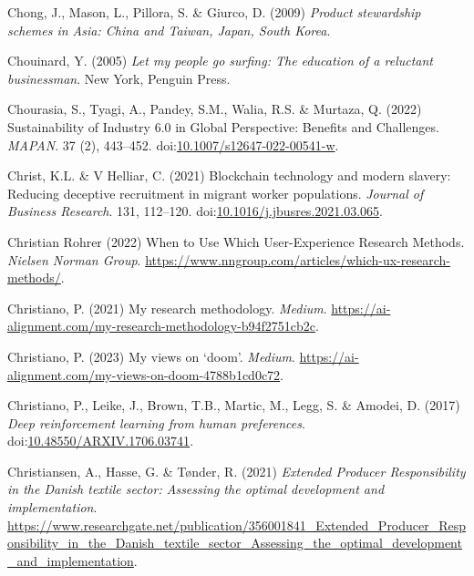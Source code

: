 \documentclass[
  letterpaper,
  DIV=11,
  numbers=noendperiod]{scrartcl}
\newlength{\cslhangindent}
\newenvironment{CSLReferences}[2] %
 {\begin{list}{}{%
  \setlength{\itemindent}{0pt}
  \setlength{\leftmargin}{0pt}
  \setlength{\parsep}{0pt}
  \ifodd #1
   \setlength{\leftmargin}{\cslhangindent}
   \setlength{\itemindent}{-1\cslhangindent}
  \fi
  \setlength{\itemsep}{#2\baselineskip}}}
 {\end{list}}
\begin{document}
\begin{CSLReferences}{0}{1}
Chong, J., Mason, L., Pillora, S. \& Giurco, D. (2009) \emph{Product
stewardship schemes in {Asia}: {China} and {Taiwan}, {Japan}, {South
Korea}}.

Chouinard, Y. (2005) \emph{Let my people go surfing: The education of a
reluctant businessman}. New York, Penguin Press.

Chourasia, S., Tyagi, A., Pandey, S.M., Walia, R.S. \& Murtaza, Q.
(2022) Sustainability of {Industry} 6.0 in {Global Perspective}:
{Benefits} and {Challenges}. \emph{MAPAN}. 37 (2), 443--452.
doi:\href{https://doi.org/10.1007/s12647-022-00541-w}{10.1007/s12647-022-00541-w}.

Christ, K.L. \& V Helliar, C. (2021) Blockchain technology and modern
slavery: {Reducing} deceptive recruitment in migrant worker populations.
\emph{Journal of Business Research}. 131, 112--120.
doi:\href{https://doi.org/10.1016/j.jbusres.2021.03.065}{10.1016/j.jbusres.2021.03.065}.

Christian Rohrer (2022) When to {Use Which User-Experience Research
Methods}. \emph{Nielsen Norman Group}.
\url{https://www.nngroup.com/articles/which-ux-research-methods/}.

Christiano, P. (2021) My research methodology. \emph{Medium}.
\url{https://ai-alignment.com/my-research-methodology-b94f2751cb2c}.

Christiano, P. (2023) My views on {`doom'}. \emph{Medium}.
\url{https://ai-alignment.com/my-views-on-doom-4788b1cd0c72}.

Christiano, P., Leike, J., Brown, T.B., Martic, M., Legg, S. \& Amodei,
D. (2017) \emph{Deep reinforcement learning from human preferences}.
doi:\href{https://doi.org/10.48550/ARXIV.1706.03741}{10.48550/ARXIV.1706.03741}.

Christiansen, A., Hasse, G. \& Tønder, R. (2021) \emph{Extended
{Producer Responsibility} in the {Danish} textile sector: {Assessing}
the optimal development and implementation}.
\url{https://www.researchgate.net/publication/356001841_Extended_Producer_Responsibility_in_the_Danish_textile_sector_Assessing_the_optimal_development_and_implementation}.


\end{CSLReferences}
\end{document}
